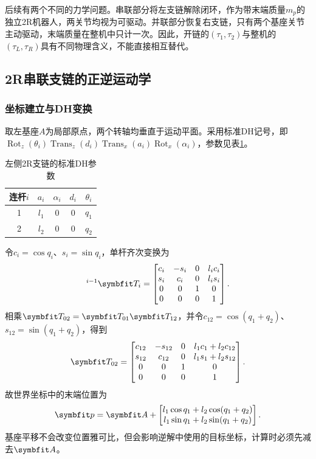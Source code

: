 后续有两个不同的力学问题。串联部分将左支链解除闭环，作为带末端质量$m_p$的独立2R机器人，两关节均视为可驱动。并联部分恢复右支链，只有两个基座关节主动驱动，末端质量在整机中只计一次。因此，开链的$(\tau_1,\tau_2)$与整机的$(\tau_L,\tau_R)$具有不同物理含义，不能直接相互替代。

\subsection{2R串联支链的正逆运动学}
\label{sec:serial_kinematics}

\subsubsection{坐标建立与DH变换}

取左基座$A$为局部原点，两个转轴均垂直于运动平面。采用标准DH记号\cite{denavit1955}，即$\operatorname{Rot}_z(\theta_i)\operatorname{Trans}_z(d_i)\operatorname{Trans}_x(a_i)\operatorname{Rot}_x(\alpha_i)$，参数见表\ref{tab:dh}。
\begin{table}[htbp]
\centering\caption{左侧2R支链的标准DH参数}\label{tab:dh}
\begin{tabular}{ccccc}\toprule 连杆$i$ & $a_i$ & $\alpha_i$ & $d_i$ & $\theta_i$\\\midrule
1 & $l_1$ & 0 & 0 & $q_1$\\
2 & $l_2$ & 0 & 0 & $q_2$\\\bottomrule\end{tabular}
\end{table}
令$c_i=\cos q_i$、$s_i=\sin q_i$，单杆齐次变换为
\begin{equation}
{}^{i-1}\vect T_i=
\begin{bmatrix}
c_i&-s_i&0&l_i c_i\\s_i&c_i&0&l_i s_i\\0&0&1&0\\0&0&0&1
\end{bmatrix}.
\end{equation}
相乘$\vect T_{02}=\vect T_{01}\vect T_{12}$，并令$c_{12}=\cos(q_1+q_2)$、$s_{12}=\sin(q_1+q_2)$，得到
\begin{equation}
\vect T_{02}=\begin{bmatrix}
c_{12}&-s_{12}&0&l_1 c_1+l_2 c_{12}\\
s_{12}&c_{12}&0&l_1 s_1+l_2 s_{12}\\
0&0&1&0\\0&0&0&1
\end{bmatrix}.
\end{equation}
故世界坐标中的末端位置为
\begin{equation}
\vect p=\vect A+
\begin{bmatrix}l_1\cos q_1+l_2\cos(q_1+q_2)\\l_1\sin q_1+l_2\sin(q_1+q_2)\end{bmatrix}.
\label{eq:fk}
\end{equation}
基座平移不会改变位置雅可比，但会影响逆解中使用的目标坐标，计算时必须先减去$\vect A$。

